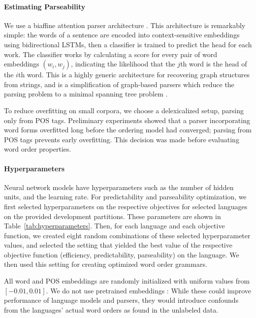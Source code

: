 \documentclass[10pt,twoside,lineno]{article}
\begin{document}
\paragraph{Estimating Parseability}
We use a biaffine attention parser architecture \citep{kiperwasser2016simple,zhang2017dependency,dozat2017stanford}. This architecture is remarkably simple: the words of a sentence are encoded into context-sensitive embeddings using bidirectional LSTMs, then a classifier is trained to predict the head for each work. The classifier works by calculating a score for every pair of word embeddings $(w_i, w_j)$, indicating the likelihood that the $j$th word is the head of the $i$th word. This is a highly generic architecture for recovering graph structures from strings, and is a simplification of graph-based parsers which reduce the parsing problem to a minimal spanning tree problem \citep{mcdonald2005nonprojective}.

To reduce overfitting on small corpora, we choose a delexicalized setup, parsing only from POS tags. Preliminary experiments showed that a parser incorporating word forms overfitted long before the ordering model had converged; parsing from POS tags prevents early overfitting.
This decision was made before evaluating word order properties.

\paragraph{Hyperparameters}


Neural network models have hyperparameters such as the number of hidden units, and the learning rate. 
For predictability and parseability optimization, we first selected hyperparameters on the respective objectives for selected languages on the provided development partitions.
These parameters are shown in Table~\ref{tab:hyperparameters}.
Then, for each language and each objective function, we created eight random combinations of these selected hyperparameter values, and selected the setting that yielded the best value of the respective objective function (efficiency, predictability, parseability) on the language. We then used this setting for creating optimized word order grammars. 




All word and POS embeddings are randomly initialized with uniform values from $[-0.01, 0.01]$.
We do not use pretrained embeddings \citep{peters2018deep}: While these could improve performance of language models and parsers, they would introduce confounds from the languages' actual word orders as found in the unlabeled data.
\end{document}
